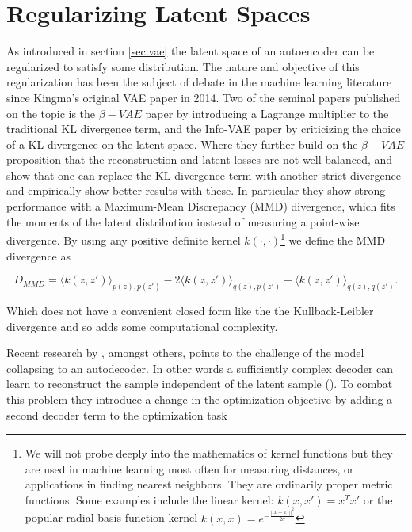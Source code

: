 \section{Regularizing Latent Spaces}\label{sec:latent}

As introduced in section \ref{sec:vae} the latent space of an autoencoder can be regularized to satisfy some distribution. The nature and objective of this regularization has been the subject of debate in the machine learning literature since Kingma's original VAE paper in 2014. Two of the seminal papers published on the topic is the $\beta-VAE$ paper by \citet{Higgins2017} introducing a Lagrange multiplier to the traditional KL divergence term, and the Info-VAE paper by \citet{Zhao} criticizing the choice of a KL-divergence on the latent space. Where they further build on the $\beta-VAE$ proposition that the reconstruction and latent losses are not well balanced, and show that one can replace the KL-divergence term with another strict divergence and empirically show better results with these. In particular they show strong performance with a Maximum-Mean Discrepancy (MMD) divergence, which fits the moments of the latent distribution instead of measuring a point-wise divergence. By using any positive definite kernel $k(\cdot, \cdot)$\footnote{We will not probe deeply into the mathematics of kernel functions but they are used in machine learning most often for measuring distances, or applications in finding nearest neighbors. They are ordinarily proper metric functions. Some examples include the linear kernel: $k(x, x') = x^Tx'$ or the popular radial basis function kernel $k(x, x)=e^{-\frac{||x - x'||^2}{2\sigma}}$}  we define the MMD divergence as  

\begin{equation}\label{eq:mmd}
D_{MMD} = \langle k(z, z')\rangle_{p(z), p(z')} - 2 \langle k(z, z')\rangle_{q(z), p(z')} + \langle k(z, z')\rangle_{q(z), q(z')}.
\end{equation}

\noindent Which does not have a convenient closed form like the the Kullback-Leibler divergence and so adds some computational complexity. 

Recent research by \citet{Seybold2019}, amongst others, points to the challenge of the model collapsing to an autodecoder. In other words a sufficiently complex decoder can learn to reconstruct the sample independent of the latent sample (\cite{Seybold2019}). To combat this problem they introduce a change in the optimization objective by adding a second decoder term to the optimization task

